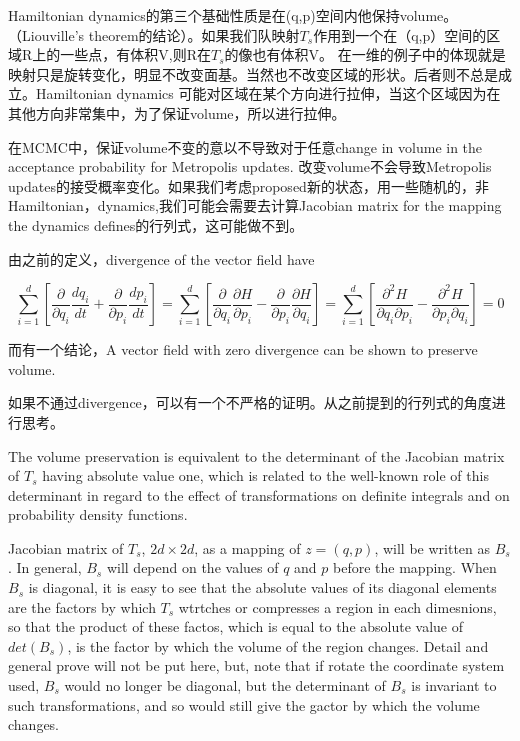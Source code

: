 \documentclass[
]{book}
\theoremstyle{definition}
\theoremstyle{definition}
\theoremstyle{definition}
\theoremstyle{remark}
\begin{document}
Hamiltonian dynamics的第三个基础性质是在(q,p)空间内他保持volume。（Liouville's theorem的结论）。如果我们队映射\(T_s\)作用到一个在（q,p）空间的区域R上的一些点，有体积V,则R在\(T_s\)的像也有体积V。
在一维的例子中的体现就是映射只是旋转变化，明显不改变面基。当然也不改变区域的形状。后者则不总是成立。Hamiltonian dynamics 可能对区域在某个方向进行拉伸，当这个区域因为在其他方向非常集中，为了保证volume，所以进行拉伸。

在MCMC中，保证volume不变的意以不导致对于任意change in volume in the acceptance probability for Metropolis updates. 改变volume不会导致Metropolis updates的接受概率变化。如果我们考虑proposed新的状态，用一些随机的，非Hamiltonian，dynamics,我们可能会需要去计算Jacobian matrix for the mapping the dynamics defines的行列式，这可能做不到。

由之前的定义，divergence of the vector field have

\[
\sum_{i=1}^{d}\left[\frac{\partial}{\partial q_{i}} \frac{d q_{i}}{d t}+\frac{\partial}{\partial p_{i}} \frac{d p_{i}}{d t}\right]=\sum_{i=1}^{d}\left[\frac{\partial}{\partial q_{i}} \frac{\partial H}{\partial p_{i}}-\frac{\partial}{\partial p_{i}} \frac{\partial H}{\partial q_{i}}\right]=\sum_{i=1}^{d}\left[\frac{\partial^{2} H}{\partial q_{i} \partial p_{i}}-\frac{\partial^{2} H}{\partial p_{i} \partial q_{i}}\right]=0
\]

而有一个结论，A vector field with zero divergence can be shown to preserve volume.

如果不通过divergence，可以有一个不严格的证明。从之前提到的行列式的角度进行思考。

The volume preservation is equivalent to the determinant of the Jacobian matrix of \(T_s\) having absolute value one, which is related to the well-known role of this determinant in regard to the effect of transformations on definite integrals and on probability density functions.

Jacobian matrix of \(T_s\), \(2d\times 2d\), as a mapping of \(z=(q,p)\), will be written as \(B_s\). In general, \(B_s\) will depend on the values of \(q\) and \(p\) before the mapping. When \(B_s\) is diagonal, it is easy to see that the absolute values of its diagonal elements are the factors by which \(T_s\) wtrtches or compresses a region in each dimesnions, so that the product of these factos, which is equal to the absolute value of \(det(B_s)\), is the factor by which the volume of the region changes. Detail and general prove will not be put here, but, note that if rotate the coordinate system used, \(B_s\) would no longer be diagonal, but the determinant of \(B_s\) is invariant to such transformations, and so would still give the gactor by which the volume changes.
\end{document}
